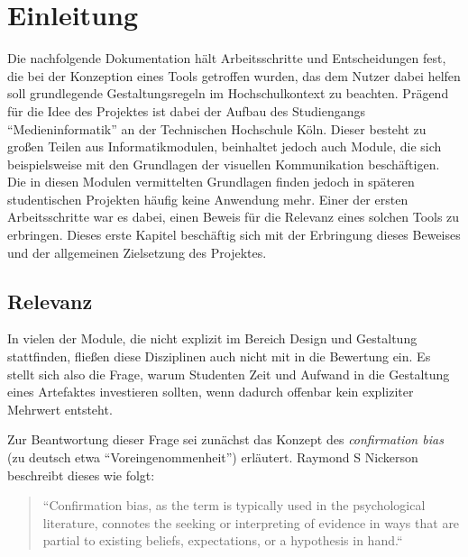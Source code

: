 
\chapter{Einleitung} %

\label{Einleitung} %


Die nachfolgende Dokumentation hält Arbeitsschritte und Entscheidungen fest, die bei der  Konzeption eines Tools getroffen wurden, das dem Nutzer dabei helfen soll grundlegende Gestaltungsregeln im Hochschulkontext zu beachten.
Prägend für die Idee des Projektes ist dabei der Aufbau des Studiengangs “Medieninformatik” an der Technischen Hochschule Köln. Dieser besteht zu großen Teilen aus Informatikmodulen, beinhaltet jedoch auch Module, die sich beispielsweise mit den Grundlagen der visuellen Kommunikation beschäftigen. Die in diesen Modulen vermittelten Grundlagen finden jedoch in späteren studentischen Projekten häufig keine Anwendung mehr.
Einer der ersten Arbeitsschritte war es dabei, einen Beweis für die Relevanz eines solchen Tools zu erbringen. Dieses erste Kapitel beschäftig sich mit der Erbringung dieses Beweises und der allgemeinen Zielsetzung des Projektes.


\section{Relevanz}
In vielen der Module, die nicht explizit im Bereich Design und Gestaltung stattfinden, fließen diese Disziplinen auch nicht mit in die Bewertung ein. Es stellt sich also die Frage, warum Studenten Zeit und Aufwand in die Gestaltung eines Artefaktes investieren sollten, wenn dadurch offenbar kein expliziter Mehrwert entsteht.

Zur Beantwortung dieser Frage sei zunächst das Konzept des \textit{confirmation bias} (zu deutsch etwa “Voreingenommenheit”) erläutert. Raymond S Nickerson beschreibt dieses wie folgt:

\begin{quote}
“Confirmation bias, as the term is typically used in the psychological literature, connotes the seeking or interpreting of evidence in ways that are partial to existing beliefs, expectations, or a hypothesis in hand.“ \cite{nickerson1998confirmation}
\end{quote}

